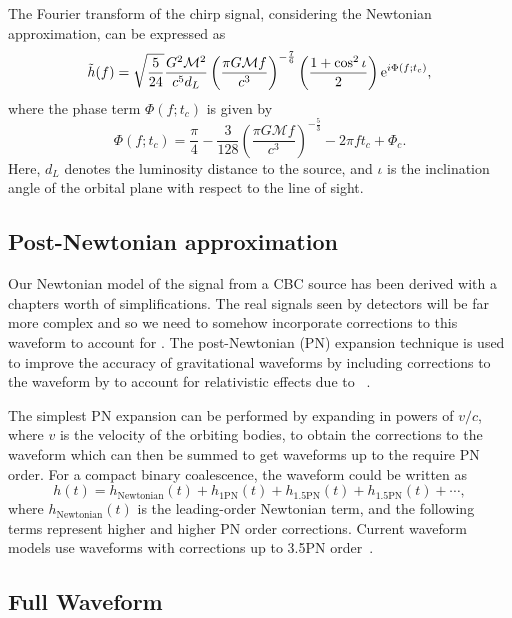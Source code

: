The Fourier transform of the chirp signal, considering the Newtonian approximation, can be expressed as
%
\begin{equation}
    \Tilde{h}(f) = \sqrt{\frac{5}{24}} \frac{G^2 \mathcal{M}^2}{c^5 d_L} \left(\frac{\pi G \mathcal{M} f}{c^3}\right)^{-\frac{7}{6}} \left(\frac{1 + \cos^2 \iota}{2}\right) {\rm e}^{i \Phi(f; t_c)},
\end{equation}
%
where the phase term \( \Phi(f; t_c) \) is given by
%
\begin{equation}
    \Phi(f; t_c) = \frac{\pi}{4} - \frac{3}{128} \left(\frac{\pi G \mathcal{M} f}{c^3}\right)^{-\frac{5}{3}} - 2\pi f t_c + \Phi_c.
\end{equation}
%
Here, \( d_L \) denotes the luminosity distance to the source, and \( \iota \) is the inclination angle of the orbital plane with respect to the line of sight.

\subsection{\label{1:sec:post_newtonian_treatment}Post-Newtonian approximation}

Our Newtonian model of the \gwadj signal from a CBC source has been derived with a chapters worth of simplifications. The real signals seen by \gwadj detectors will be far more complex and so we need to somehow incorporate corrections to this waveform to account for \GR. The post-Newtonian (PN) expansion technique is used to improve the accuracy of gravitational waveforms by including corrections to the waveform by to account for relativistic effects due to \GR~\cite{2PN_1:1996, 2PN_2:1996, 2PN_3:1995}.

The simplest PN expansion can be performed by expanding in powers of \( v/c \), where \( v \) is the velocity of the orbiting bodies, to obtain the corrections to the waveform which can then be summed to get waveforms up to the require PN order. For a compact binary coalescence, the waveform could be written as
%
\begin{equation}
    h(t) = h_{\text{Newtonian}}(t) + h_{\text{1PN}}(t) + h_{\text{1.5PN}}(t) + h_{\text{1.5PN}}(t) + \cdots,
\end{equation}
%
where \( h_{\text{Newtonian}}(t) \) is the leading-order Newtonian term, and the following terms represent higher and higher PN order corrections. Current waveform models use waveforms with corrections up to 3.5PN order~\cite{PN_models:2009}.

\subsection{\label{1:sec:full_waveform}Full Waveform}

